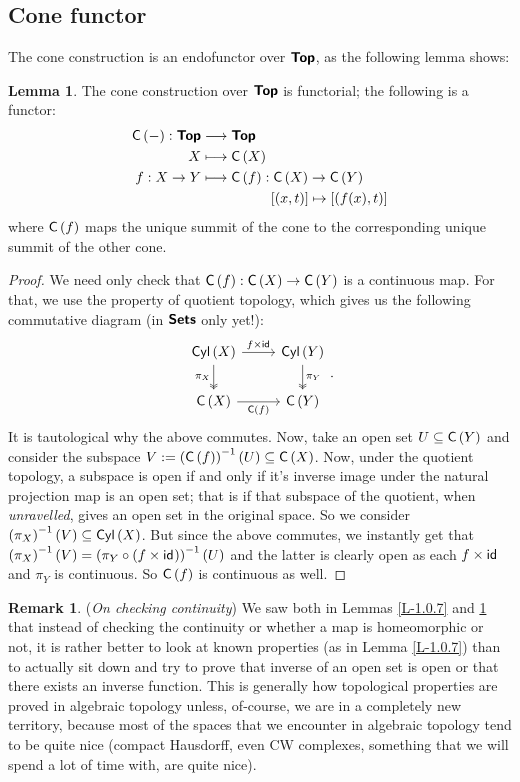 \documentclass[letterpaper,11pt,twoside]{article}
\theoremstyle{definition}
\theoremstyle{definition}
\theoremstyle{definition}
\newtheorem{remark}[proposition]{\textbf{Remark}}
\theoremstyle{definition}
\newtheorem{lemma}[proposition]{\textbf{Lemma}}
\theoremstyle{definition}
\theoremstyle{definition}
\theoremstyle{remark}
\theoremstyle{definition}
\newcommand{\cat}[1]{{\fontfamily{lmss}\selectfont 
		\text{\textbf{#1}}
}}
\newcommand{\cyl}[1]{{\fontfamily{lmss}\selectfont 
		\text{Cyl}\left(#1\right)
}}
\newcommand{\cone}[1]{{\fontfamily{lmss}\selectfont 
		\text{C}\left(#1\right)
}}
\newcommand{\id}[1]{{\fontfamily{lmss}\selectfont 
		\text{id}_{#1}
}}
\newcommand{\inv}[1]{\left(#1\right)^{-1}}
\begin{document}
	\subsection{Cone functor}
	The cone construction is an endofunctor over $\cat{Top}$, as the following lemma shows:
	\begin{lemma}\label{L-1.1.1}
	The cone construction over $\cat{Top}$ is functorial; the following is a functor:
	\begin{align*}
	    \cone{-} : \cat{Top} &\longrightarrow \cat{Top}\\
	    X&\longmapsto \cone{X}\\
	    f : X\to Y &\longmapsto \cone{f} : \cone{X} \to \cone{Y}\\
	    &\;\;\;\;\;\;\;\;\;\;\;\;\;\;\;\;\;\;[(x,t)] \mapsto [(f(x),t)]
	\end{align*}
	where $\cone{f}$ maps the unique summit of the cone to the corresponding unique summit of the other cone.
	\end{lemma}
	\begin{proof}
	    We need only check that $\cone{f} : \cone{X} \to \cone{Y}$ is a continuous map. For that, we use the property of quotient topology, which gives us the following commutative diagram (in $\cat{Sets}$ only yet!):
	    \[\begin{tikzcd}
	{\cyl{X}} & {\cyl{Y}} \\
	{\cone{X}} & {\cone{Y}}
	\arrow["{f\times \id{}}", from=1-1, to=1-2]
	\arrow["{\pi_X}"', two heads, from=1-1, to=2-1]
	\arrow["{\pi_Y}", two heads, from=1-2, to=2-2]
	\arrow["{\cone{f}}"', from=2-1, to=2-2]
\end{tikzcd}.\]
    It is tautological why the above commutes. Now, take an open set $U\subseteq \cone{Y}$ and consider the subspace $V : =\inv{\cone{f}}(U) \subseteq \cone{X}$. Now, under the quotient topology, a subspace is open if and only if it's inverse image under the natural projection map is an open set; that is if that subspace of the quotient, when \textit{unravelled}, gives an open set in the original space. So we consider $\inv{\pi_X}(V) \subseteq \cyl{X}$. But since the above commutes, we instantly get that $\inv{\pi_X}(V) = \inv{\pi_Y \circ (f\times \id{})}(U)$ and the latter is clearly open as each $f\times \id{}$ and $\pi_Y$ is continuous. So $\cone{f}$ is continuous as well.
	\end{proof}
	\begin{remark}\label{R-1.1.2}
	    (\textit{On checking continuity}) We saw both in Lemmas \ref{L-1.0.7} and \ref{L-1.1.1} that instead of checking the continuity or whether a map is homeomorphic or not, it is rather better to look at known properties (as in Lemma \ref{L-1.0.7}) than to actually sit down and try to prove that inverse of an open set is open or that there exists an inverse function. This is generally how topological properties are proved in algebraic topology unless, of-course, we are in a completely new territory, because most of the spaces that we encounter in algebraic topology tend to be quite nice (compact Hausdorff, even CW complexes, something that we will spend a lot of time with, are quite nice).
	\end{remark}
\end{document}
